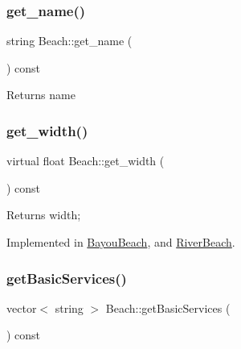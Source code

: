 \mbox{\label{class_beach_ae84e85693f8377673df6e91fba4503eb}} 
\subsubsection{\texorpdfstring{get\+\_\+name()}{get\_name()}}
{\footnotesize\ttfamily string Beach\+::get\+\_\+name (\begin{DoxyParamCaption}{ }\end{DoxyParamCaption}) const}

\begin{DoxyReturn}{Returns}
name 
\end{DoxyReturn}
\mbox{\label{class_beach_af28e3603ea98766d94c9e8eb9f76d509}} 
\subsubsection{\texorpdfstring{get\+\_\+width()}{get\_width()}}
{\footnotesize\ttfamily virtual float Beach\+::get\+\_\+width (\begin{DoxyParamCaption}{ }\end{DoxyParamCaption}) const\hspace{0.3cm}{\ttfamily [pure virtual]}}

\begin{DoxyReturn}{Returns}
width; 
\end{DoxyReturn}


Implemented in \hyperlink{class_bayou_beach_a4d4fe4911ac6772ac0335e133de498c8}{Bayou\+Beach}, and \hyperlink{class_river_beach_a4fc528a34d80e3e2a6a48e53ab3e3f49}{River\+Beach}.

\mbox{\label{class_beach_a23305808d894c08a79fa3a0d201d0c51}} 
\subsubsection{\texorpdfstring{get\+Basic\+Services()}{getBasicServices()}}
{\footnotesize\ttfamily vector$<$ string $>$ Beach\+::get\+Basic\+Services (\begin{DoxyParamCaption}{ }\end{DoxyParamCaption}) const}

